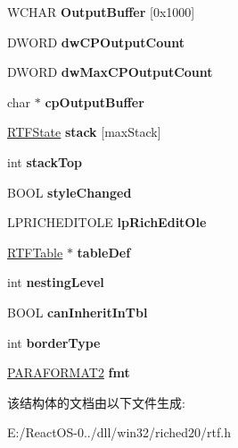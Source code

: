\begin{DoxyCompactItemize}
W\+C\+H\+AR {\bfseries Output\+Buffer} \mbox{[}0x1000\mbox{]}
\item 
\mbox{\label{struct___r_t_f___info_ad327655a8fce49fee1df0b5a5ece5700}} 
D\+W\+O\+RD {\bfseries dw\+C\+P\+Output\+Count}
\item 
\mbox{\label{struct___r_t_f___info_addf820ced3bcf82494a3d2f7252d3c55}} 
D\+W\+O\+RD {\bfseries dw\+Max\+C\+P\+Output\+Count}
\item 
\mbox{\label{struct___r_t_f___info_afff931842c1784e679b3c8972a32369f}} 
char $\ast$ {\bfseries cp\+Output\+Buffer}
\item 
\mbox{\label{struct___r_t_f___info_afea68272c426874735526b0db6f19f39}} 
\hyperlink{structtag_r_t_f_state}{R\+T\+F\+State} {\bfseries stack} \mbox{[}max\+Stack\mbox{]}
\item 
\mbox{\label{struct___r_t_f___info_a4e254f56af11cc6e82dea26948f3c64d}} 
int {\bfseries stack\+Top}
\item 
\mbox{\label{struct___r_t_f___info_aa683da6ed24467679ea8c1b1113ecea1}} 
B\+O\+OL {\bfseries style\+Changed}
\item 
\mbox{\label{struct___r_t_f___info_a048767f17e50c38d11cd2762bcee61d9}} 
L\+P\+R\+I\+C\+H\+E\+D\+I\+T\+O\+LE {\bfseries lp\+Rich\+Edit\+Ole}
\item 
\mbox{\label{struct___r_t_f___info_a4c6a6b0340504acd65ebdb987fee7023}} 
\hyperlink{struct_r_t_f_table}{R\+T\+F\+Table} $\ast$ {\bfseries table\+Def}
\item 
\mbox{\label{struct___r_t_f___info_a6a9236554a80a237336995a2c7ab2f8b}} 
int {\bfseries nesting\+Level}
\item 
\mbox{\label{struct___r_t_f___info_a63877317f6d0a8a398350856d52b91a0}} 
B\+O\+OL {\bfseries can\+Inherit\+In\+Tbl}
\item 
\mbox{\label{struct___r_t_f___info_a501582eaa4c02c4ca9153d366c9f4320}} 
int {\bfseries border\+Type}
\item 
\mbox{\label{struct___r_t_f___info_abf7e8d48de466841b6cdfc0468952501}} 
\hyperlink{struct__paraformat2}{P\+A\+R\+A\+F\+O\+R\+M\+A\+T2} {\bfseries fmt}
\end{DoxyCompactItemize}


该结构体的文档由以下文件生成\+:\begin{DoxyCompactItemize}
\item 
E\+:/\+React\+O\+S-\/0../dll/win32/riched20/rtf.\+h\end{DoxyCompactItemize}
